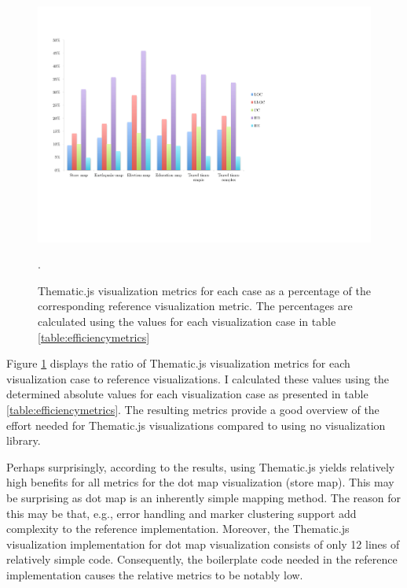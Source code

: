 \begin{figure}[htbp]
  \begin{center}
    \includegraphics[width=\textwidth]{images/evaluation-results.pdf}
    \caption{Thematic.js visualization metrics for each case as a percentage of the corresponding reference visualization metric. The percentages are calculated using the values for each visualization case in table \ref{table:efficiencymetrics}}.
    \label{fig:evaluationchart}
  \end{center}
\end{figure}

Figure \ref{fig:evaluationchart} displays the ratio of Thematic.js visualization metrics for each visualization case to reference visualizations. I calculated these values using the determined absolute values for each visualization case as presented in table \ref{table:efficiencymetrics}. The resulting metrics provide a good overview of the effort needed for Thematic.js visualizations compared to using no visualization library.

Perhaps surprisingly, according to the results, using Thematic.js yields relatively high benefits for all metrics for the dot map visualization (store map). This may be surprising as dot map is an inherently simple mapping method. The reason for this may be that, e.g., error handling and marker clustering support add complexity to the reference implementation. Moreover, the Thematic.js visualization implementation for dot map visualization consists of only 12 lines of relatively simple code. Consequently, the boilerplate code needed in the reference implementation causes the relative metrics to be notably low.

